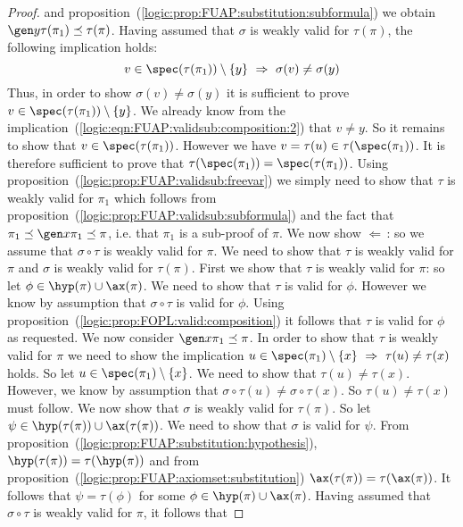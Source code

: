 \begin{proof}
and proposition~(\ref{logic:prop:FUAP:substitution:subformula}) we
obtain $\gen y\tau(\pi_{1})\preceq\tau(\pi)$. Having assumed that
$\sigma$ is weakly valid for $\tau(\pi)$, the following implication
holds:
    \begin{equation}\label{logic:eqn:FUAP:validsub:composition:3}
    v\in\spec(\tau(\pi_{1}))\setminus\{y\}\ \Rightarrow\
    \sigma(v)\neq\sigma(y)
    \end{equation}
Thus, in order to show $\sigma(v)\neq\sigma(y)$ it is sufficient to
prove $v\in\spec(\tau(\pi_{1}))\setminus\{y\}$. We already know from
the implication~(\ref{logic:eqn:FUAP:validsub:composition:2}) that
$v\neq y$. So it remains to show that $v\in\spec(\tau(\pi_{1}))$.
However we have $v=\tau(u)\in\tau(\spec(\pi_{1}))$. It is therefore
sufficient to prove that
$\tau(\spec(\pi_{1}))=\spec(\tau(\pi_{1}))$. Using
proposition~(\ref{logic:prop:FUAP:validsub:freevar}) we simply need
to show that $\tau$ is weakly valid for $\pi_{1}$ which follows from
proposition~(\ref{logic:prop:FUAP:validsub:subformula}) and the fact
that $\pi_{1}\preceq\gen x\pi_{1}\preceq\pi$, i.e. that $\pi_{1}$ is
a sub-proof of $\pi$. We now show $\Leftarrow$\,: so we assume that
$\sigma\circ\tau$ is weakly valid for $\pi$. We need to show that
$\tau$ is weakly valid for $\pi$ and $\sigma$ is weakly valid for
$\tau(\pi)$. First we show that $\tau$ is weakly valid for $\pi$: so
let $\phi\in\hyp(\pi)\cup\ax(\pi)$. We need to show that $\tau$ is
valid for $\phi$. However we know by assumption that
$\sigma\circ\tau$ is valid for $\phi$. Using
proposition~(\ref{logic:prop:FOPL:valid:composition}) it follows
that $\tau$ is valid for $\phi$ as requested. We now consider $\gen
x\pi_{1}\preceq\pi$. In order to show that $\tau$ is weakly valid
for $\pi$ we need to show the implication
$u\in\spec(\pi_{1})\setminus\{x\}\ \Rightarrow\ \tau(u)\neq\tau(x)$
holds. So let $u\in\spec(\pi_{1})\setminus\{x\}$. We need to show
that $\tau(u)\neq\tau(x)$. However, we know by assumption that
$\sigma\circ\tau(u)\neq\sigma\circ\tau(x)$. So $\tau(u)\neq\tau(x)$
must follow. We now show that $\sigma$ is weakly valid for
$\tau(\pi)$. So let $\psi\in\hyp(\tau(\pi))\cup\ax(\tau(\pi))$. We
need to show that $\sigma$ is valid for $\psi$. From
proposition~(\ref{logic:prop:FUAP:substitution:hypothesis}),
$\hyp(\tau(\pi))=\tau(\hyp(\pi))$ and from
proposition~(\ref{logic:prop:FUAP:axiomset:substitution})
$\ax(\tau(\pi))=\tau(\ax(\pi))$. It follows that $\psi=\tau(\phi)$
for some $\phi\in\hyp(\pi)\cup\ax(\pi)$. Having assumed that
$\sigma\circ\tau$ is weakly valid for $\pi$, it follows that

\end{proof}

